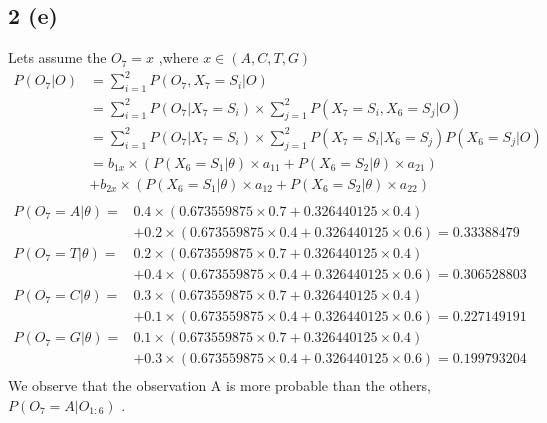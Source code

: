 \documentclass[10pt,letterpaper]{article}
\begin{document}
\subsection{2 (e)}    	
Lets assume the $O_7 =x$ ,where $ x \in (A,C,T,G)$	
\begin{align*}
P(O_7|O) &= \sum_{i=1}^2 P(O_7,X_7=S_i|O)\\
&=  \sum_{i=1}^2 P(O_7|X_7=S_i) \times \sum_{j=1}^2 P(X_7=S_i,X_6=S_j|O)\\
&=  \sum_{i=1}^2 P(O_7|X_7=S_i) \times \sum_{j=1}^2 P(X_7=S_i|X_6=S_j) P(X_6=S_j|O)\\
& = b_{1x} \times (P(X_6=S_1|\theta)\times a_{11} + P(X_6=S_2|\theta) \times a_{21}) \\ &+ b_{2x} \times (P(X_6=S_1|\theta)\times a_{12} + P(X_6=S_2|\theta) \times a_{22})\\
\end{align*}
\begin{align*}
P(O_7=A|\theta) =&0.4\times (0.673559875 \times 0.7 +	0.326440125\times	0.4) \\
&+ 0.2\times ( 0.673559875\times	0.4 +	0.326440125\times	0.6)=0.33388479 \\
P(O_7=T|\theta) =&0.2\times (0.673559875 \times 0.7 +	0.326440125\times	0.4) \\
&+ 0.4\times ( 0.673559875\times	0.4 +	0.326440125\times	0.6)=0.306528803 \\
P(O_7=C|\theta) =&0.3\times (0.673559875 \times 0.7 +	0.326440125\times	0.4) \\
&+ 0.1\times ( 0.673559875\times	0.4 +	0.326440125\times	0.6)=0.227149191 \\
P(O_7=G|\theta) =&0.1\times (0.673559875 \times 0.7 +	0.326440125\times	0.4) \\
&+ 0.3\times ( 0.673559875\times	0.4 +	0.326440125\times	0.6)=0.199793204 \\
 \end{align*}	
We observe that the observation A  is more probable than the others,  { $P(O_7= A| O_{1:6})$ }.		 	
\end{document}
